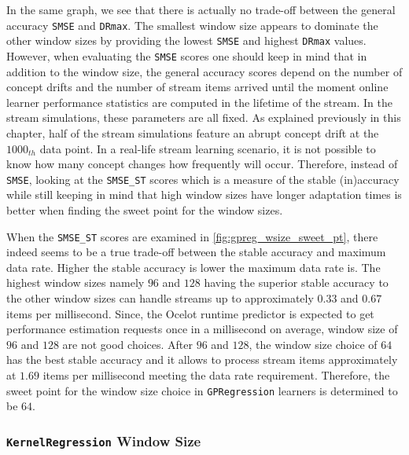 In the same graph, we see that there is actually no trade-off between the general accuracy \texttt{SMSE} and \texttt{DRmax}. The smallest window size appears to dominate the other window sizes by providing the lowest \texttt{SMSE} and highest \texttt{DRmax} values. However, when evaluating the \texttt{SMSE} scores one should keep in mind that in addition to the window size, the general accuracy scores depend on the number of concept drifts and the number of stream items arrived until the moment online learner performance statistics are computed in the lifetime of the stream. In the stream simulations, these parameters are all fixed. As explained previously in this chapter, half of the stream simulations feature an abrupt concept drift at the $1000_{th}$ data point. In a real-life stream learning scenario, it is not possible to know how many concept changes how frequently will occur. Therefore, instead of \texttt{SMSE}, looking at the \texttt{SMSE\_ST} scores which is a measure of the stable (in)accuracy while still keeping in mind that high window sizes have longer adaptation times is better when finding the sweet point for the window sizes. 

When the \texttt{SMSE\_ST} scores are examined in \ref{fig:gpreg_wsize_sweet_pt}, there indeed seems to be a true trade-off between the stable accuracy and maximum data rate. Higher the stable accuracy is lower the maximum data rate is. The highest window sizes namely $96$ and $128$ having the superior stable accuracy to the other window sizes can handle streams up to approximately $0.33$ and $0.67$ items per millisecond. Since, the Ocelot runtime predictor is expected to get performance estimation requests once in a millisecond on average, window size of $96$ and $128$ are not good choices. After $96$ and $128$, the window size choice of $64$ has the best stable accuracy and it allows to process stream items approximately at $1.69$ items per millisecond meeting the data rate requirement. Therefore, the sweet point for the window size choice in \texttt{GPRegression} learners is determined to be $64$.

\subsubsection{\texttt{KernelRegression} Window Size}

